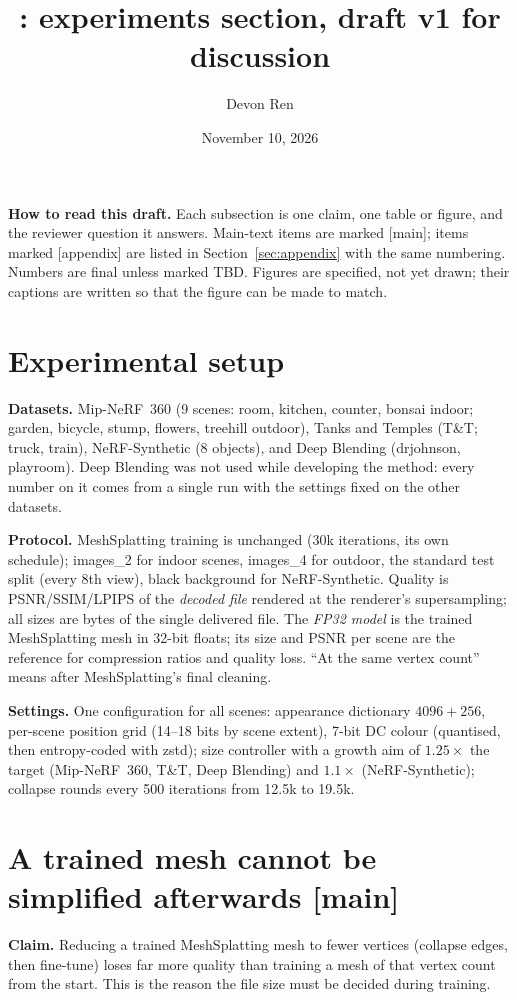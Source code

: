 \documentclass[10pt]{article}
\title{\BM{}: experiments section, draft v1 for discussion}
\author{Devon Ren}
\date{November 10, 2026}
\newcommand{\MS}{MeshSplatting}
\begin{document}
\maketitle

\noindent\textbf{How to read this draft.} Each subsection is one claim, one table or figure, and the reviewer question it answers. Main-text items are marked [main]; items marked [appendix] are listed in Section~\ref{sec:appendix} with the same numbering. Numbers are final unless marked TBD. Figures are specified, not yet drawn; their captions are written so that the figure can be made to match.

\section{Experimental setup}
\textbf{Datasets.} Mip-NeRF~360 (9 scenes: room, kitchen, counter, bonsai indoor; garden, bicycle, stump, flowers, treehill outdoor), Tanks and Temples (T\&T; truck, train), NeRF-Synthetic (8 objects), and Deep Blending (drjohnson, playroom). Deep Blending was not used while developing the method: every number on it comes from a single run with the settings fixed on the other datasets.

\textbf{Protocol.} \MS{} training is unchanged (30k iterations, its own schedule); images\_2 for indoor scenes, images\_4 for outdoor, the standard test split (every 8th view), black background for NeRF-Synthetic. Quality is PSNR/SSIM/LPIPS of the \emph{decoded file} rendered at the renderer's supersampling; all sizes are bytes of the single delivered file. The \emph{FP32 model} is the trained \MS{} mesh in 32-bit floats; its size and PSNR per scene are the reference for compression ratios and quality loss. ``At the same vertex count'' means after \MS{}'s final cleaning.

\textbf{Settings.} One configuration for all scenes: appearance dictionary $4096+256$, per-scene position grid (14--18 bits by scene extent), 7-bit DC colour (quantised, then entropy-coded with zstd); size controller with a growth aim of $1.25\times$ the target (Mip-NeRF~360, T\&T, Deep Blending) and $1.1\times$ (NeRF-Synthetic); collapse rounds every 500 iterations from 12.5k to 19.5k.

\section{A trained mesh cannot be simplified afterwards [main]}
\label{sec:e1}
\textbf{Claim.} Reducing a trained \MS{} mesh to fewer vertices (collapse edges, then fine-tune) loses far more quality than training a mesh of that vertex count from the start. This is the reason the file size must be decided during training.
\end{document}
